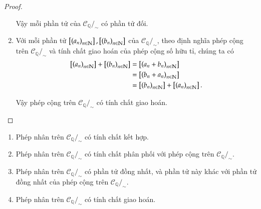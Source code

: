 \begin{proof}
\begin{enumerate}[label={(\roman*)}]
              Vậy mỗi phần tử của $\mathscr{C}_{\mathbb{Q}}/_{\sim}$ có phần tử đối.
        \item Với mỗi phần tử $\left[{\left({a_{n}}\right)}_{{n}\in\mathbb{N}}\right], \left[{\left({b_{n}}\right)}_{{n}\in\mathbb{N}}\right]$ của $\mathscr{C}_{\mathbb{Q}}/_{\sim}$, theo định nghĩa phép cộng trên $\mathscr{C}_{\mathbb{Q}}/_{\sim}$ và tính chất giao hoán của phép cộng số hữu tỉ, chúng ta có
              \begin{align*}
                  \left[{\left({a_{n}}\right)}_{{n}\in\mathbb{N}}\right] + \left[{\left({b_{n}}\right)}_{{n}\in\mathbb{N}}\right] & = \left[{\left({a_{n} + b_{n}}\right)}_{{n}\in\mathbb{N}}\right]              \\
                                                        & = \left[{\left({b_{n} + a_{n}}\right)}_{{n}\in\mathbb{N}}\right]              \\
                                                        & = \left[{\left({b_{n}}\right)}_{{n}\in\mathbb{N}}\right] + \left[{\left({a_{n}}\right)}_{{n}\in\mathbb{N}}\right].
              \end{align*}

              Vậy phép cộng trên $\mathscr{C}_{\mathbb{Q}}/_{\sim}$ có tính chất giao hoán.
    \end{enumerate}
\end{proof}

\begin{appendixthm}\label{appendixthm:rational-cauchy-sequences-abelian-group}
    \begin{enumerate}[label={(\roman*)}]
        \item Phép nhân trên $\mathscr{C}_{\mathbb{Q}}/_{\sim}$ có tính chất kết hợp.
        \item Phép nhân trên $\mathscr{C}_{\mathbb{Q}}/_{\sim}$ có tính chất phân phối với phép cộng trên $\mathscr{C}_{\mathbb{Q}}/_{\sim}$.
        \item Phép nhân trên $\mathscr{C}_{\mathbb{Q}}/_{\sim}$ có phần tử đồng nhất, và phần tử này khác với phần tử đồng nhất của phép cộng trên $\mathscr{C}_{\mathbb{Q}}/_{\sim}$.
        \item Phép nhân trên $\mathscr{C}_{\mathbb{Q}}/_{\sim}$ có tính chất giao hoán.
    \end{enumerate}
\end{appendixthm}

